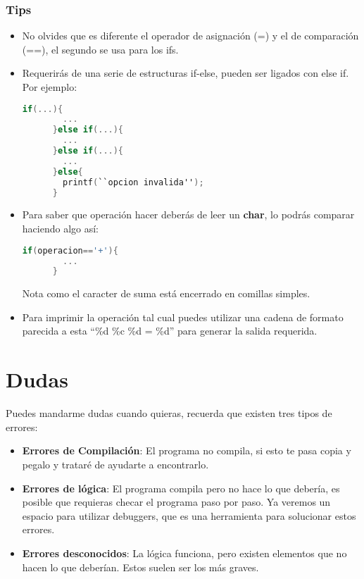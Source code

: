 \documentclass{article}
\begin{document}
\subsubsection{Tips}
\begin{itemize}
  \item No olvides que es diferente el operador de asignaci\'on (=) y el de comparaci\'on (==), el segundo se usa para los ifs.
  \item Requerir\'as de una serie de estructuras if-else, pueden ser ligados con else if. Por ejemplo:
    \begin{lstlisting}[language=C]
      if(...){
        ...
      }else if(...){
        ...
      }else if(...){
        ...
      }else{
        printf(``opcion invalida'');
      }
    \end{lstlisting}
  \item Para saber que operaci\'on hacer deber\'as de leer un \textbf{char}, lo podr\'as comparar haciendo algo as\'i:
    \begin{lstlisting}[language=C]
      if(operacion=='+'){
        ...
      }
    \end{lstlisting}
    Nota como el caracter de suma est\'a encerrado en comillas simples.
  \item Para imprimir la operaci\'on tal cual puedes utilizar una cadena de formato parecida a esta ``\%d \%c \%d = \%d'' para generar la salida requerida.
\end{itemize}
\section{Dudas}
Puedes mandarme dudas cuando quieras, recuerda que existen tres tipos de errores:

\begin{itemize}
  \item \textbf{Errores de Compilaci\'on}: El programa no compila, si esto te pasa copia y pegalo y tratar\'e de ayudarte a encontrarlo.
  \item \textbf{Errores de l\'ogica}: El programa compila pero no hace lo que deber\'ia, es posible que requieras checar el programa paso por paso. Ya veremos un espacio para utilizar debuggers, que es una herramienta para solucionar estos errores.
  \item \textbf{Errores desconocidos}: La l\'ogica funciona, pero existen elementos que no hacen lo que deber\'ian. Estos suelen ser los m\'as graves. 
\end{itemize}
\end{document}
